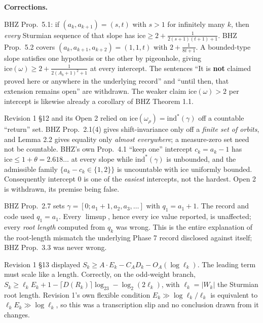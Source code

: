 \documentclass[11pt]{article}
\begin{document}
\medskip
\noindent\textbf{Corrections.}
\begin{description}[leftmargin=2.2em,style=nextline,itemsep=3pt]

\item[C1. Conjecture 12.1 is a published theorem.] BHZ Prop.\ 5.1: if $(a_k,a_{k+1})=(s,t)$ with
$s>1$ for infinitely many $k$, then \emph{every} Sturmian sequence of that slope has
$\mathrm{ice}\ge2+\frac1{2(s+1)(t+1)+1}$. BHZ Prop.\ 5.2 covers $(a_k,a_{k+1},a_{k+2})=(1,1,t)$ with
$2+\frac1{8t+1}$. A bounded-type slope satisfies one hypothesis or the other by pigeonhole, giving
$\mathrm{ice}(\omega)\ge2+\frac1{2(A_b+1)^2+1}$ at every intercept. The sentences ``It is
\textbf{not} claimed proved here or anywhere in the underlying record'' and ``until then, that
extension remains open'' are withdrawn. The weaker claim $\mathrm{ice}(\omega)>2$ per intercept is
likewise already a corollary of BHZ Theorem 1.1.

\item[C2. The ``exceptional-orbit reduction'' is false.] Revision 1 \S12 and its Open 2 relied on
$\mathrm{ice}(\omega_\rho)=\mathrm{ind}^*(\gamma)$ off a countable ``return'' set. BHZ Prop.\ 2.1(4)
gives shift-invariance only off a \emph{finite set of orbits}, and Lemma 2.2 gives equality only
\emph{almost everywhere}; a measure-zero set need not be countable. BHZ's own Prop.\ 4.1 ``keep
one'' intercept $c_k=a_k-1$ has $\mathrm{ice}\le1+\theta=2.618\ldots$ at every slope while
$\mathrm{ind}^*(\gamma)$ is unbounded, and the admissible family $\{a_k-c_k\in\{1,2\}\}$ is
uncountable with $\mathrm{ice}$ uniformly bounded. Consequently intercept $0$ is one of the
\emph{easiest} intercepts, not the hardest. Open 2 is withdrawn, its premise being false.

\item[C3. Convergent-denominator indexing.] BHZ Prop.\ 2.7 sets
$\gamma=[0;a_1{+}1,a_2,a_3,\dots]$ with $q_1=a_1+1$. The record and code used $q_1=a_1$. Every
$\limsup$, hence every $\mathrm{ice}$ value reported, is unaffected; every \emph{root length}
computed from $q_k$ was wrong. This is the entire explanation of the root-length mismatch the
underlying Phase 7 record disclosed against itself; BHZ Prop.\ 3.3 was never wrong.

\item[C4. Missing length factor.] Revision 1 \S13 displayed
$S_k\ge A\cdot E_k-C_A D_k-O_A(\log\ell_k)$. The leading term must scale like a length. Correctly,
on the odd-weight branch,
$S_k\ge\ell_kE_k+1-\lceil D(R_k)\rceil\log_23-\log_2(2\ell_k)$, with $\ell_k=|W_k|$ the Sturmian
root length. Revision 1's own flexible condition $E_k\gg\log\ell_k/\ell_k$ is equivalent to
$\ell_kE_k\gg\log\ell_k$, so this was a transcription slip and no conclusion drawn from it changes.


\end{description}
\end{document}

